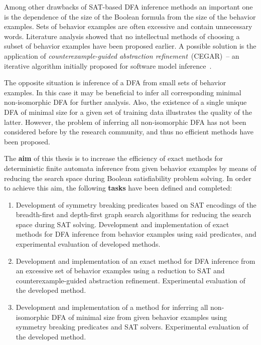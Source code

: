 Among other drawbacks of SAT-based DFA inference methods an important one is the dependence of the size of the Boolean formula from the size of the behavior examples.
Sets of behavior examples are often excessive and contain unnecessary words.
Literature analysis showed that no intellectual methods of choosing a subset of behavior examples have been proposed earlier.
A possible solution is the application of \emph{counterexample-guided abstraction refinement}~(CEGAR)~-- an iterative algorithm initially proposed for software model inference~\cite{DBLP:conf/cav/ClarkeGJLV00,мандрыкин2013введение-en}.

The opposite situation is inference of a DFA from small sets of behavior examples.
In this case it may be beneficial to infer all corresponding minimal non-isomorphic DFA for further analysis.
Also, the existence of a single unique DFA of minimal size for a given set of training data illustrates the quality of the latter.
However, the problem of inferring all non-isomorphic DFA has not been considered before by the research community, and thus no efficient methods have been proposed.

The \textbf{aim} of this thesis is to increase the efficiency of exact methods for deterministic finite automata inference from given behavior examples by means of reducing the search space during Boolean satisfiability problem solving.
In order to achieve this aim, the following \textbf{tasks} have been defined and completed:
\begin{enumerate}
  \item Development of symmetry breaking predicates based on SAT encodings of the breadth-first and depth-first graph search algorithms for reducing the search space during SAT solving.
  Development and implementation of exact methods for DFA inference from behavior examples using said predicates, and experimental evaluation of developed methods.

  \item Development and implementation of an exact method for DFA inference from an excessive set of behavior examples using a reduction to SAT and counterexample-guided abstraction refinement.
  Experimental evaluation of the developed method.
  
  \item Development and implementation of a method for inferring all non-isomorphic DFA of minimal size from given behavior examples using symmetry breaking predicates and SAT solvers.
  Experimental evaluation of the developed method.
\end{enumerate}

